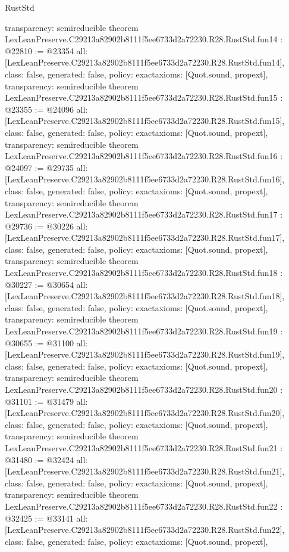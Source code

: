 \begin{lexlean}{RustStd}
\begin{coremodule}
{  transparency: semireducible
}
theorem LexLeanPreserve.C29213a82902b8111f5ee6733d2a72230.R28.RustStd.fun14 : @22810 := @23354 {
  all: [LexLeanPreserve.C29213a82902b8111f5ee6733d2a72230.R28.RustStd.fun14],
  class: false,
  generated: false,
  policy: exact{axioms: [Quot.sound, propext]},
  transparency: semireducible
}
theorem LexLeanPreserve.C29213a82902b8111f5ee6733d2a72230.R28.RustStd.fun15 : @23355 := @24096 {
  all: [LexLeanPreserve.C29213a82902b8111f5ee6733d2a72230.R28.RustStd.fun15],
  class: false,
  generated: false,
  policy: exact{axioms: [Quot.sound, propext]},
  transparency: semireducible
}
theorem LexLeanPreserve.C29213a82902b8111f5ee6733d2a72230.R28.RustStd.fun16 : @24097 := @29735 {
  all: [LexLeanPreserve.C29213a82902b8111f5ee6733d2a72230.R28.RustStd.fun16],
  class: false,
  generated: false,
  policy: exact{axioms: [Quot.sound, propext]},
  transparency: semireducible
}
theorem LexLeanPreserve.C29213a82902b8111f5ee6733d2a72230.R28.RustStd.fun17 : @29736 := @30226 {
  all: [LexLeanPreserve.C29213a82902b8111f5ee6733d2a72230.R28.RustStd.fun17],
  class: false,
  generated: false,
  policy: exact{axioms: [Quot.sound, propext]},
  transparency: semireducible
}
theorem LexLeanPreserve.C29213a82902b8111f5ee6733d2a72230.R28.RustStd.fun18 : @30227 := @30654 {
  all: [LexLeanPreserve.C29213a82902b8111f5ee6733d2a72230.R28.RustStd.fun18],
  class: false,
  generated: false,
  policy: exact{axioms: [Quot.sound, propext]},
  transparency: semireducible
}
theorem LexLeanPreserve.C29213a82902b8111f5ee6733d2a72230.R28.RustStd.fun19 : @30655 := @31100 {
  all: [LexLeanPreserve.C29213a82902b8111f5ee6733d2a72230.R28.RustStd.fun19],
  class: false,
  generated: false,
  policy: exact{axioms: [Quot.sound, propext]},
  transparency: semireducible
}
theorem LexLeanPreserve.C29213a82902b8111f5ee6733d2a72230.R28.RustStd.fun20 : @31101 := @31479 {
  all: [LexLeanPreserve.C29213a82902b8111f5ee6733d2a72230.R28.RustStd.fun20],
  class: false,
  generated: false,
  policy: exact{axioms: [Quot.sound, propext]},
  transparency: semireducible
}
theorem LexLeanPreserve.C29213a82902b8111f5ee6733d2a72230.R28.RustStd.fun21 : @31480 := @32424 {
  all: [LexLeanPreserve.C29213a82902b8111f5ee6733d2a72230.R28.RustStd.fun21],
  class: false,
  generated: false,
  policy: exact{axioms: [Quot.sound, propext]},
  transparency: semireducible
}
theorem LexLeanPreserve.C29213a82902b8111f5ee6733d2a72230.R28.RustStd.fun22 : @32425 := @33141 {
  all: [LexLeanPreserve.C29213a82902b8111f5ee6733d2a72230.R28.RustStd.fun22],
  class: false,
  generated: false,
  policy: exact{axioms: [Quot.sound, propext]},
}
\end{coremodule}
\end{lexlean}
